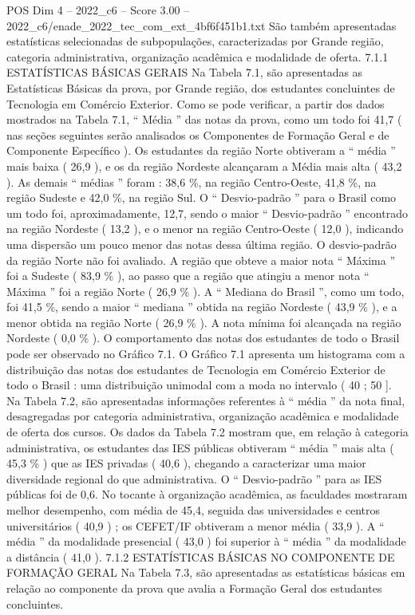 \begin{textsample}{POS Dim 4 – 2022\_c6 – Score 3.00 – 2022\_c6/enade\_2022\_tec\_com\_ext\_4bf6f451b1.txt}
São também apresentadas estatísticas selecionadas de subpopulações, caracterizadas por Grande região, categoria administrativa, organização acadêmica e modalidade de oferta. 7.1.1 ESTATÍSTICAS BÁSICAS GERAIS Na Tabela 7.1, são apresentadas as Estatísticas Básicas da prova, por Grande região, dos estudantes concluintes de Tecnologia em Comércio Exterior.
Como se pode verificar, a partir dos dados mostrados na Tabela 7.1, “ Média ” das notas da prova, como um todo foi 41,7 ( nas seções seguintes serão analisados os Componentes de Formação Geral e de Componente Específico ).
Os estudantes da região Norte obtiveram a “ média ” mais baixa ( 26,9 ), e os da região Nordeste alcançaram a Média mais alta ( 43,2 ).
As demais “ médias ” foram : 38,6 \%, na região Centro-Oeste, 41,8 \%, na região Sudeste e 42,0 \%, na região Sul.
O “ Desvio-padrão ” para o Brasil como um todo foi, aproximadamente, 12,7, sendo o maior “ Desvio-padrão ” encontrado na região Nordeste ( 13,2 ), e o menor na região Centro-Oeste ( 12,0 ), indicando uma dispersão um pouco menor das notas dessa última região.
O desvio-padrão da região Norte não foi avaliado.
A região que obteve a maior nota “ Máxima ” foi a Sudeste ( 83,9 \% ), ao passo que a região que atingiu a menor nota “ Máxima ” foi a região Norte ( 26,9 \% ).
A “ Mediana do Brasil ”, como um todo, foi 41,5 \%, sendo a maior “ mediana ” obtida na região Nordeste ( 43,9 \% ), e a menor obtida na região Norte ( 26,9 \% ).
A nota mínima foi alcançada na região Nordeste ( 0,0 \% ).
O comportamento das notas dos estudantes de todo o Brasil pode ser observado no Gráfico 7.1.
O Gráfico 7.1 apresenta um histograma com a distribuição das notas dos estudantes de Tecnologia em Comércio Exterior de todo o Brasil : uma distribuição unimodal com a moda no intervalo ( 40 ; 50 ].
Na Tabela 7.2, são apresentadas informações referentes à “ média ” da nota final, desagregadas por categoria administrativa, organização acadêmica e modalidade de oferta dos cursos.
Os dados da Tabela 7.2 mostram que, em relação à categoria administrativa, os estudantes das IES públicas obtiveram “ média ” mais alta ( 45,3 \% ) que as IES privadas ( 40,6 ), chegando a caracterizar uma maior diversidade regional do que administrativa.
O “ Desvio-padrão ” para as IES públicas foi de 0,6.
No tocante à organização acadêmica, as faculdades mostraram melhor desempenho, com média de 45,4, seguida das universidades e centros universitários ( 40,9 ) ; os CEFET/IF obtiveram a menor média ( 33,9 ).
A “ média ” da modalidade presencial ( 43,0 ) foi superior à “ média ” da modalidade a distância ( 41,0 ). 7.1.2 ESTATÍSTICAS BÁSICAS NO COMPONENTE DE FORMAÇÃO GERAL Na Tabela 7.3, são apresentadas as estatísticas básicas em relação ao componente da prova que avalia a Formação Geral dos estudantes concluintes.

\end{textsample}
